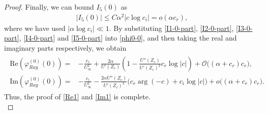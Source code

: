 \documentclass[reqno,11pt]{amsart}
\numberwithin{equation}{section}
\numberwithin{equation}{section}
\theoremstyle{plain}
\begin{document}
\begin{proof}
		Finally, we can bound $I_5(0)$ as
		\begin{align}\label{I5-0-part}
			|I_5(0)|\leq C\alpha^2 |c\log c_i|=o(\alpha c_r),
		\end{align}
		where we have used $|\alpha \log c_i|\ll 1$. By substituting \eqref{I1-0-part}, \eqref{I2-0-part}, \eqref{I3-0-part}, \eqref{I4-0-part} and \eqref{I5-0-part} into \eqref{phi0-0}, and then taking the real and imaginary parts respectively, we obtain
		\begin{align}\begin{aligned}
				\text{Re}\left(\varphi_{Ray}^{(0)}(0)\right)= & -\frac{c_r}{U_\infty^2}+ \frac{2\alpha}{U'(Z_c)}\left(1-\frac{U''(Z_c)}{U'(Z_c)^2}c_r\log|c|\right) +\mathcal{O}\big((\alpha+c_r)c_r\big), \\
				\text{Im}\left(\varphi_{Ray}^{(0)}(0)\right)= &  -\frac{c_i}{U_\infty^2}- \frac{2\alpha U''(Z_c)}{U'(Z_c)^3}\Big(c_r\arg(-c)+c_i\log|c|\Big)
				+o\big((\alpha+c_r)c_r\big).\nonumber
		\end{aligned}\end{align}
		Thus, the proof of \eqref{Re1} and \eqref{Im1} is complete.\\
		

\end{proof}
\end{document}
